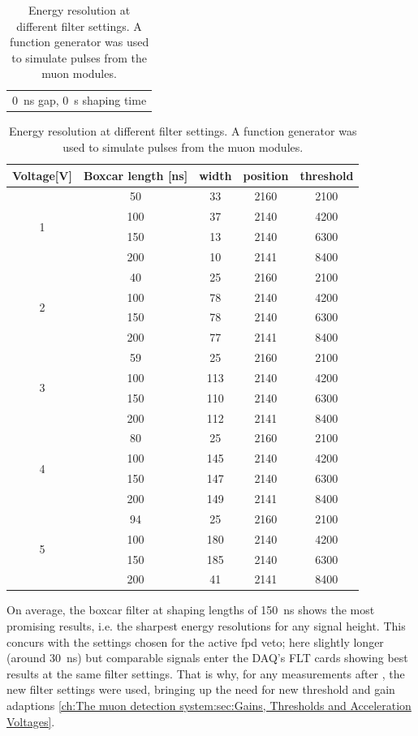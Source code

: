   \begin{table}
	\begin{tabular}{c}
	\SI{0}{\nano\second} gap, \SI{0}{\second} shaping time\\
	\end{tabular}
  	\begin{tabular}{|c|c|c|c|c|}
  		\hline
  		Voltage[V] & Boxcar length [ns] & width & position & threshold\\
  		\hline
  		\multirow{4}{*}{1} & 50 & 33 & 2160 & 2100\\
  		 & 100 & 37 & 2140 & 4200\\
  		 & 150 & 13 & 2140 & 6300\\
  		 & 200 & 10 & 2141 & 8400\\
  		 \hline
  		 \multirow{4}{*}{2} & 40 & 25 & 2160 & 2100\\
  		 & 100 & 78 & 2140 & 4200\\
  		 & 150 & 78 & 2140 & 6300\\
  		 & 200 & 77 & 2141 & 8400\\
  		 \hline
  		 \multirow{4}{*}{3} & 59 & 25 & 2160 & 2100\\
  		 & 100 & 113 & 2140 & 4200\\
  		 & 150 & 110 & 2140 & 6300\\
  		 & 200 & 112 & 2141 & 8400\\
  		 \hline
  		 \multirow{4}{*}{4} & 80 & 25 & 2160 & 2100\\
  		 & 100 & 145 & 2140 & 4200\\
  		 & 150 & 147 & 2140 & 6300\\
  		 & 200 & 149 & 2141 & 8400\\
  		 \hline
  		 \multirow{4}{*}{5} & 94 & 25 & 2160 & 2100\\
  		 & 100 & 180 & 2140 & 4200\\
  		 & 150 & 185 & 2140 & 6300\\
  		 & 200 & 41 & 2141 & 8400\\
  		 \hline	
  	\end{tabular}
  \caption[Energy resolution dependant on filter setting]{Energy resolution at different filter settings. A function generator was used to simulate pulses from the muon modules.}
	\centering
  \end{table}
  
  On average, the boxcar filter at shaping lengths of \SI{150}{\nano\second} shows the most promising results, i.e. the sharpest energy resolutions for any signal height. This concurs with the settings chosen for the active fpd veto; here slightly longer (around \SI{30}{\nano\second}) but comparable signals enter the DAQ's FLT cards showing best results at the same filter settings\cite{KevinWierman}.
  That is why, for any measurements after , the new filter settings were used, bringing up the need for new threshold and gain adaptions \ref{ch:The muon detection system:sec:Gains, Thresholds and Acceleration Voltages}. 
  
